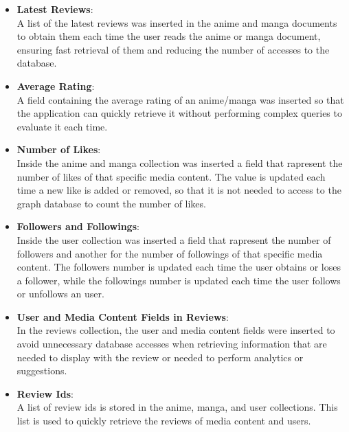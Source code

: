 \begin{itemize}
    \item \textbf{Latest Reviews}: \\
    A list of the latest reviews was inserted in the anime and manga documents to obtain them each time the user reads
    the anime or manga document, ensuring fast retrieval of them and reducing the number of accesses to the database.

    \vspace{\baselineskip}

    \item \textbf{Average Rating}: \\
    A field containing the average rating of an anime/manga was inserted so that the application can quickly retrieve it
    without performing complex queries to evaluate it each time.

    \vspace{\baselineskip}

    \item \textbf{Number of Likes}: \\
    Inside the anime and manga collection was inserted a field that rapresent the number of likes of that specific media content.
    The value is updated each time a new like is added or removed, so that it is not needed to access to the graph database to
    count the number of likes.

    \vspace{\baselineskip}

    \item \textbf{Followers and Followings}: \\
    Inside the user collection was inserted a field that rapresent the number of followers and another for the number of followings
    of that specific media content. The followers number is updated each time the user obtains or loses a follower, while the followings
    number is updated each time the user follows or unfollows an user.

    \vspace{\baselineskip}

    \item \textbf{User and Media Content Fields in Reviews}: \\
    In the reviews collection, the user and media content fields were inserted to avoid unnecessary database accesses when retrieving
    information that are needed to display with the review or needed to perform analytics or suggestions.

    \vspace{\baselineskip}

    \item \textbf{Review Ids}: \\
    A list of review ids is stored in the anime, manga, and user collections. This list is used to 
    quickly retrieve the reviews of media content and users.
\end{itemize}

